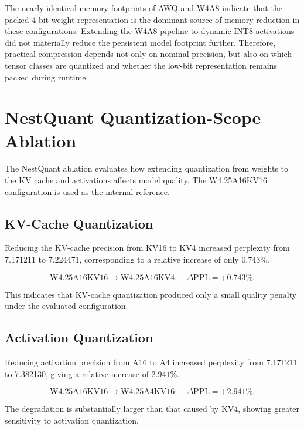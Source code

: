 The nearly identical memory footprints of AWQ and W4A8 indicate that
the packed 4-bit weight representation is the dominant source of memory
reduction in these configurations. Extending the W4A8 pipeline to
dynamic INT8 activations did not materially reduce the persistent model
footprint further. Therefore, practical compression depends not only on
nominal precision, but also on which tensor classes are quantized and
whether the low-bit representation remains packed during runtime.


\section{NestQuant Quantization-Scope Ablation}
The NestQuant ablation evaluates how extending quantization from weights
to the KV cache and activations affects model quality. The
W4.25A16KV16 configuration is used as the internal reference.

\subsection{KV-Cache Quantization}
Reducing the KV-cache precision from KV16 to KV4 increased perplexity
from 7.171211 to 7.224471, corresponding to a relative increase of only
\(0.743\%\).

\begin{equation}
\mathrm{W4.25A16KV16}
\rightarrow
\mathrm{W4.25A16KV4}
:
\quad
\Delta \mathrm{PPL}=+0.743\%.
\end{equation}

This indicates that KV-cache quantization produced only a small quality
penalty under the evaluated configuration.

\subsection{Activation Quantization}
Reducing activation precision from A16 to A4 increased perplexity from
7.171211 to 7.382130, giving a relative increase of \(2.941\%\).

\begin{equation}
\mathrm{W4.25A16KV16}
\rightarrow
\mathrm{W4.25A4KV16}
:
\quad
\Delta \mathrm{PPL}=+2.941\%.
\end{equation}

The degradation is substantially larger than that caused by KV4,
showing greater sensitivity to activation quantization.


